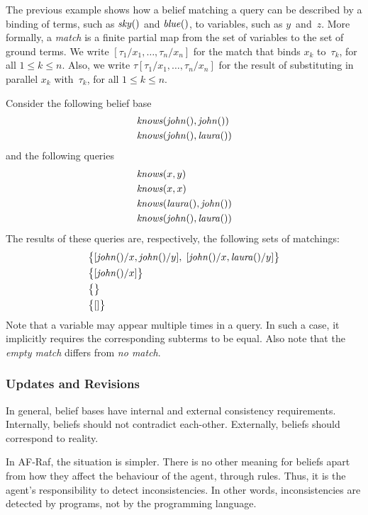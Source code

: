 \documentclass[a4paper,12pt,oneside,fleqn]{book} %
\newcommand{\todo}[1]{[\textcolor{red}{TODO}: #1]}
\renewcommand{\todo}{}
\begin{document}
The previous example shows how a belief matching a query can be described
by a binding of terms, such as ${\it sky}()$ and ${\it blue}()$, to
variables, such as $y$~and~$z$.  More formally, a \emph{match} is a finite
partial map from the set of variables to the set of ground terms.  We write
$[\tau_1/x_1,\ldots,\tau_n/x_n]$ for the match that binds $x_k$
to~$\tau_k$, for all $1\le k\le n$.  Also, we write
$\tau[\tau_1/x_1,\ldots,\tau_n/x_n]$ for the result of substituting in
parallel $x_k$ with~$\tau_k$, for all $1\le k\le n$.

\begin{example} Consider the following belief base \begin{align} &{\it
knows}({\it john}(), {\it john}()) \\ &{\it knows}({\it john}(), {\it
laura}()) \end{align} and the following queries \begin{align} &{\it
knows}(x, y) \\ &{\it knows}(x, x) \\ &{\it knows}({\it laura}(), {\it
john}()) \\ &{\it knows}({\it john}(), {\it laura}()) \end{align} The
results of these queries are, respectively, the following sets of
matchings: \begin{align} &\bigl\{ [{\it john}()/x, {\it john}()/y],\; [{\it
john}()/x,{\it laura}()/y] \bigr\} \\ &\bigl\{ [{\it john}()/x] \bigr\} \\
&\bigl\{\bigr\} \\ &\bigl\{[]\bigr\} \end{align} Note that a variable may
appear multiple times in a query.  In such a case, it implicitly requires
the corresponding subterms to be equal.  Also note that the \emph{empty
match} differs from \emph{no match}.
\end{example}


\subsubsection{Updates and Revisions}

In general, belief bases have internal and external consistency
requirements.  Internally, beliefs should not contradict each-other.
Externally, beliefs should correspond to reality.

In AF-Raf, the situation is simpler.  There is no other meaning for beliefs
apart from how they affect the behaviour of the agent, through rules.
Thus, it is the agent's responsibility to detect inconsistencies.  In other
words, inconsistencies are detected by programs, not by the programming
language.
\end{document}

